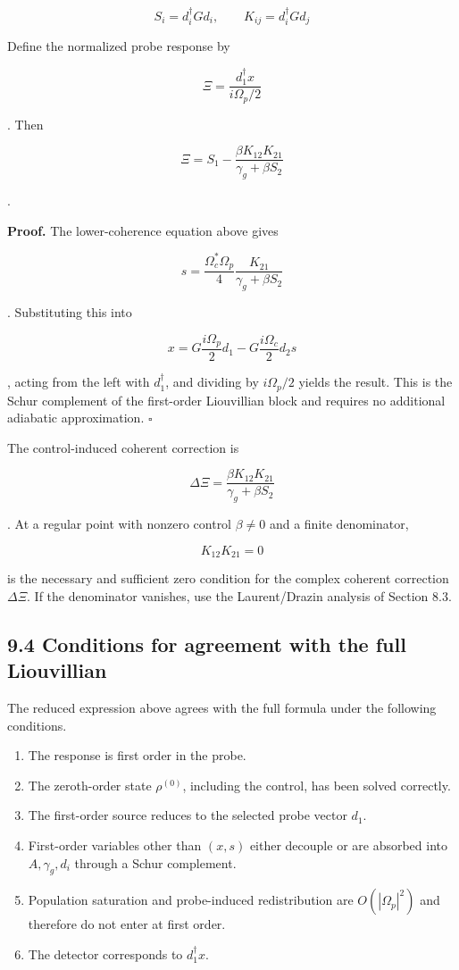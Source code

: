 \documentclass[
  10pt,
  a4paper,
]{article}
\providecommand{\tightlist}{%
  \setlength{\itemsep}{0pt}\setlength{\parskip}{0pt}}
\begin{document}
\[
S_i=d_i^\dagger Gd_i,
\qquad
K_{ij}=d_i^\dagger Gd_j
\]

Define the normalized probe response by

\[
\Xi
=\frac{d_1^\dagger x}{i\Omega_p/2}
\]

. Then

\[
\boxed{
\Xi
=S_1-
\frac{\beta K_{12}K_{21}}
{\gamma_g+\beta S_2}
}
\]

.

\textbf{Proof.} The lower-coherence equation above gives

\[
s=
\frac{\Omega_c^*\Omega_p}{4}
\frac{K_{21}}
{\gamma_g+\beta S_2}
\]

. Substituting this into

\[
x
=G\frac{i\Omega_p}{2}d_1
-G\frac{i\Omega_c}{2}d_2s
\]

, acting from the left with \(d_1^\dagger\), and dividing by
\(i\Omega_p/2\) yields the result. This is the Schur complement of the
first-order Liouvillian block and requires no additional adiabatic
approximation. \(\square\)

The control-induced coherent correction is

\[
\boxed{
\Delta\Xi
=\frac{\beta K_{12}K_{21}}
{\gamma_g+\beta S_2}
}
\]

. At a regular point with nonzero control \(\beta\neq0\) and a finite
denominator,

\[
\boxed{K_{12}K_{21}=0}
\]

is the necessary and sufficient zero condition for the complex coherent
correction \(\Delta\Xi\). If the denominator vanishes, use the
Laurent/Drazin analysis of Section 8.3.

\subsection{9.4 Conditions for agreement with the full
Liouvillian}\label{conditions-for-agreement-with-the-full-liouvillian}

The reduced expression above agrees with the full formula under the
following conditions.

\begin{enumerate}
\def\labelenumi{\arabic{enumi}.}
\tightlist
\item
  The response is first order in the probe.
\item
  The zeroth-order state \(\rho^{(0)}\), including the control, has been
  solved correctly.
\item
  The first-order source reduces to the selected probe vector \(d_1\).
\item
  First-order variables other than \((x,s)\) either decouple or are
  absorbed into \(A,\gamma_g,d_i\) through a Schur complement.
\item
  Population saturation and probe-induced redistribution are
  \(O(|\Omega_p|^2)\) and therefore do not enter at first order.
\item
  The detector corresponds to \(d_1^\dagger x\).
\end{enumerate}
\end{document}
